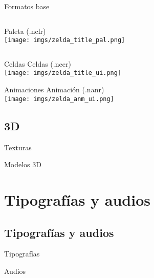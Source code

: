 \begin{frame}{Formatos base}
    \begin{columns}
    \begin{column}{0.45\textwidth}
        \centering{}Paleta (.nclr) \\ \vspace{5pt}
        \texttt{[image: imgs/zelda\_title\_pal.png]}
    \end{column}
    \begin{column}{0.05\textwidth}
    \end{column}
    \begin{column}{0.45\textwidth}
        \centering{} \\ \vspace{5pt}
    \end{column}
    \end{columns}
\end{frame}

\begin{frame}{Celdas}
    \centering{}Celdas (.ncer) \\ \vspace{5pt}
    \texttt{[image: imgs/zelda\_title\_ui.png]}
\end{frame}

\begin{frame}{Animaciones}
    \centering{}Animación (.nanr) \\ \vspace{5pt}
    \texttt{[image: imgs/zelda\_anm\_ui.png]}
\end{frame}

\subsection{3D}
\begin{frame}{Texturas}
\end{frame}

\begin{frame}{Modelos 3D}
\end{frame}

\section{Tipografías y audios}
\subsection{Tipografías y audios}
\begin{frame}{Tipografías}
\end{frame}

\begin{frame}{Audios}
\end{frame}
